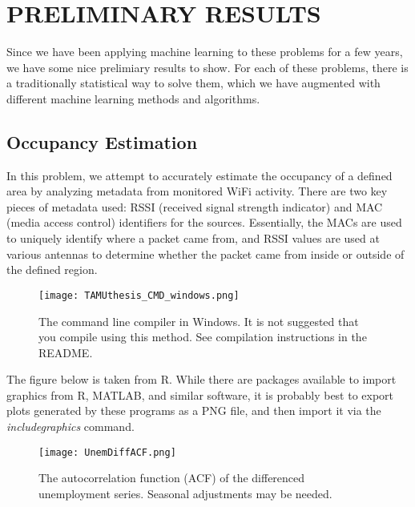 %
%
%



\chapter{PRELIMINARY RESULTS}
Since we have been applying machine learning to these problems for a few years, we have some nice prelimiary results to show.
For each of these problems, there is a traditionally statistical way to solve them, which we have augmented with different machine learning methods and algorithms.
\section{Occupancy Estimation}
In this problem, we attempt to accurately estimate the occupancy of a defined area by analyzing metadata from monitored WiFi activity.
There are two key pieces of metadata used: RSSI (received signal strength indicator) and MAC (media access control) identifiers for the sources.
Essentially, the MACs are used to uniquely identify where a packet came from, and RSSI values are used at various antennas to determine whether the packet came from inside or outside of the defined region.

\begin{figure}[ht]
\centering
\texttt{[image: TAMUthesis\_CMD\_windows.png]}
\caption[The command line compiler in Windows.]{The command line compiler in Windows. It is not suggested that you compile using this method. See compilation instructions in the README.}

\label{fig:CMD_1}

\end{figure}


The figure below is taken from R. While there are packages available to import graphics from R, MATLAB, and similar software, it is probably best to export plots generated by these programs as a PNG file, and then import it via the \textit{includegraphics} command.

\begin{figure}[ht]
	\centering
	\texttt{[image: UnemDiffACF.png]}
	\caption{The autocorrelation function (ACF) of the differenced unemployment series. Seasonal adjustments may be needed.}
\end{figure}

